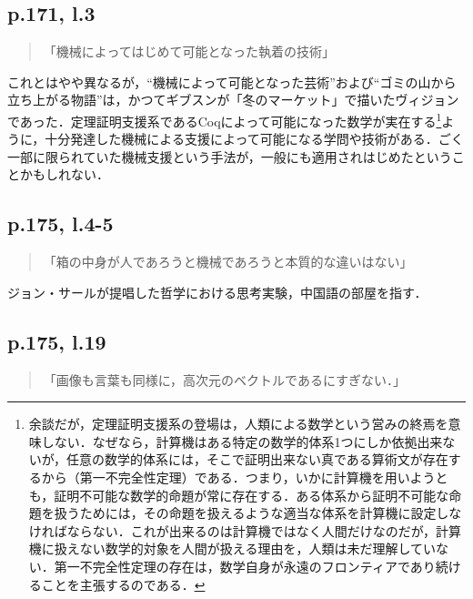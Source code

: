 \documentclass[10pt, a5paper, twoside]{jsarticle}
\theoremstyle{definition}
\begin{document}
		\subsection{p.171, l.3}

			\begin{quote}

				「機械によってはじめて可能となった執着の技術」
				
			\end{quote}

			これとはやや異なるが，“機械によって可能となった芸術”および“ゴミの山から立ち上がる物語”は，かつてギブスンが「冬のマーケット」で描いたヴィジョンであった．定理証明支援系であるCoqによって可能になった数学が実在する\footnote{余談だが，定理証明支援系の登場は，人類による数学という営みの終焉を意味しない．なぜなら，計算機はある特定の数学的体系1つにしか依拠出来ないが，任意の数学的体系には，そこで証明出来ない真である算術文が存在するから（第一不完全性定理）である．つまり，いかに計算機を用いようとも，証明不可能な数学的命題が常に存在する．ある体系から証明不可能な命題を扱うためには，その命題を扱えるような適当な体系を計算機に設定しなければならない．これが出来るのは計算機ではなく人間だけなのだが，計算機に扱えない数学的対象を人間が扱える理由を，人類は未だ理解していない．第一不完全性定理の存在は，数学自身が永遠のフロンティアであり続けることを主張するのである．}ように，十分発達した機械による支援によって可能になる学問や技術がある．ごく一部に限られていた機械支援という手法が，一般にも適用されはじめたということかもしれない．

		\subsection{p.175, l.4-5}

			\begin{quote}

				「箱の中身が人であろうと機械であろうと本質的な違いはない」
				
			\end{quote}

			ジョン・サールが提唱した哲学における思考実験，中国語の部屋を指す．

		\subsection{p.175, l.19}

			\begin{quote}
				
				「画像も言葉も同様に，高次元のベクトルであるにすぎない．」

			\end{quote}
\end{document}

